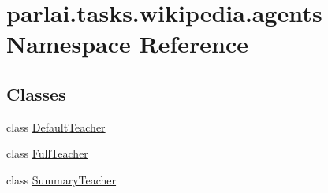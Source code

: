 \hypertarget{namespaceparlai_1_1tasks_1_1wikipedia_1_1agents}{}\section{parlai.\+tasks.\+wikipedia.\+agents Namespace Reference}
\label{namespaceparlai_1_1tasks_1_1wikipedia_1_1agents}
\subsection*{Classes}
\begin{DoxyCompactItemize}
\item 
class \hyperlink{classparlai_1_1tasks_1_1wikipedia_1_1agents_1_1DefaultTeacher}{Default\+Teacher}
\item 
class \hyperlink{classparlai_1_1tasks_1_1wikipedia_1_1agents_1_1FullTeacher}{Full\+Teacher}
\item 
class \hyperlink{classparlai_1_1tasks_1_1wikipedia_1_1agents_1_1SummaryTeacher}{Summary\+Teacher}
\end{DoxyCompactItemize}
